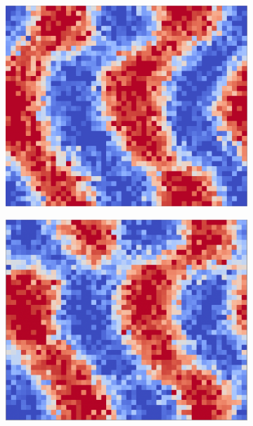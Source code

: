 \documentclass[bachelor,       %
               twoside,        %
               BCOR10mm,       %
               ngerman, english %
               ]{GAUBM}
\begin{document}
\begin{figure}[h]
  \centering
  \begin{subfigure}[b]{0.3\textwidth}
      \centering
      \includegraphics[width=\textwidth]{figures/lamella_t1.png}
      \caption{}
      \label{fig:lamella_t1}
  \end{subfigure}
    \hfill
  \begin{subfigure}[b]{0.3\textwidth}
      \centering
      \includegraphics[width=\textwidth]{figures/lamella_t2.png}
      \caption{}
      \label{fig:lamella_t2}
  \end{subfigure}

\end{figure}
\end{document}
